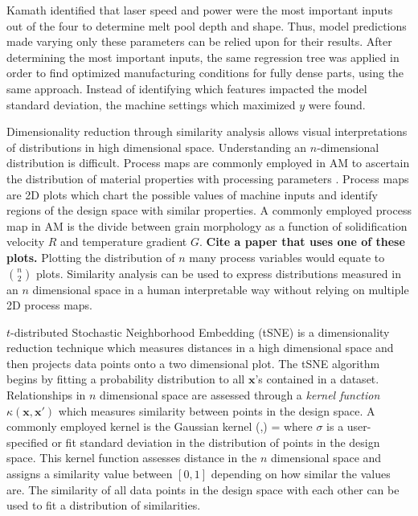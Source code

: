 Kamath identified that laser speed and power were the most important inputs out of the four to determine melt pool depth and shape. Thus, model predictions made varying only these parameters can be relied upon for their results.  After determining the most important inputs, the same regression tree was applied in order to find optimized manufacturing conditions for fully dense parts, using the same approach. Instead of identifying which features impacted the model standard deviation, the machine settings which maximized $y$ were found. 

Dimensionality reduction through similarity analysis allows visual interpretations of distributions in high dimensional space. Understanding an $n$-dimensional distribution is difficult. Process maps are commonly employed in AM to ascertain the distribution of material properties with processing parameters \cite{Beuth2001}. Process maps are 2D plots which chart the possible values of machine inputs and identify regions of the design space with similar properties. A commonly employed process map in AM is the divide between grain morphology as a function of solidification velocity $R$ and temperature gradient $G$. \textbf{Cite a paper that uses one of these plots.} Plotting the distribution of $n$ many process variables would equate to ${n \choose 2}$ plots. Similarity analysis can be used to express distributions measured in an $n$ dimensional space in a human interpretable way without relying on multiple 2D process maps. 

$t$-distributed Stochastic Neighborhood Embedding (tSNE) is a dimensionality reduction technique which measures distances in a high dimensional space and then projects data points onto a two dimensional plot. The tSNE algorithm begins by fitting a probability distribution to all $\mathbf{x}$'s contained in a dataset. Relationships in $n$ dimensional space are assessed through a \textit{kernel function} $\kappa(\mathbf{x},\mathbf{x'})$ which measures similarity between points in the design space. A commonly employed kernel is the Gaussian kernel
\eqn
	\kappa(,) = 
	\label{gausskernel}
\equ 
where $\sigma$ is a user-specified or fit standard deviation in the distribution of points in the design space. This kernel function assesses distance in the $n$ dimensional space and assigns a similarity value between $\left[0, 1\right]$ depending on how similar the values are. The similarity of all data points in the design space with each other can be used to fit a distribution of similarities. 

